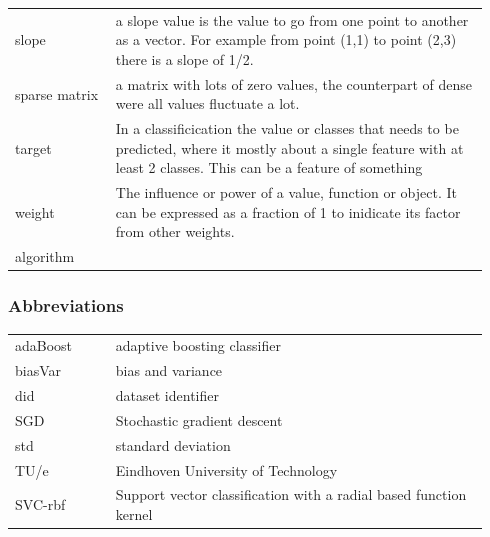 \documentclass[a4paper,10pt]{article}
\begin{document}
\begin{tabular}{ p{0.20\linewidth} p{0.7437\linewidth} }
	slope & a slope value is the value to go from one point to another as a vector. For example from point (1,1) to point (2,3) there is a slope of 1/2.\\[1ex]
	
	sparse matrix & a matrix with lots of zero values, the counterpart of dense were all values fluctuate a lot.	\\ [1ex]
	
	target & In a classificication the value or classes that needs to be predicted, where it mostly about a single feature with at least 2 classes. This can be a feature of something \\ [+1ex]
	
	
	
	weight & The influence or power of a value, function or object. It can be expressed as a fraction of 1 to inidicate its factor from other weights.	\\ [1ex]
	
	
	
	
	
	
	algorithm & \\ [1ex]	
	\end{tabular}

\subsubsection{Abbreviations}
\begin{tabular}{ p{0.20\linewidth} p{0.7437\linewidth} }
	
	adaBoost & adaptive boosting classifier \\
	
	biasVar & bias and variance \\
	
	did & dataset identifier \\
	
	SGD & Stochastic gradient descent \\
	
	std & standard deviation\\
	
	TU/e & Eindhoven University of Technology \\
	
	SVC-rbf & Support vector classification with a radial based function kernel
	
	
\end{tabular}

\newpage
\end{document}

